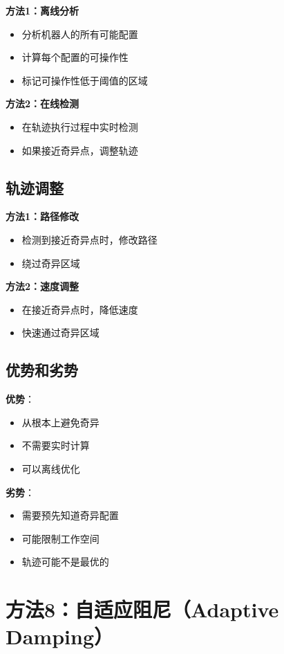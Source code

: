 \documentclass[12pt,a4paper]{article}
\begin{document}
\textbf{方法1：离线分析}
\begin{itemize}
\item 分析机器人的所有可能配置
\item 计算每个配置的可操作性
\item 标记可操作性低于阈值的区域
\end{itemize}

\textbf{方法2：在线检测}
\begin{itemize}
\item 在轨迹执行过程中实时检测
\item 如果接近奇异点，调整轨迹
\end{itemize}

\subsection{轨迹调整}

\textbf{方法1：路径修改}
\begin{itemize}
\item 检测到接近奇异点时，修改路径
\item 绕过奇异区域
\end{itemize}

\textbf{方法2：速度调整}
\begin{itemize}
\item 在接近奇异点时，降低速度
\item 快速通过奇异区域
\end{itemize}

\subsection{优势和劣势}

\textbf{优势}：
\begin{itemize}
\item 从根本上避免奇异
\item 不需要实时计算
\item 可以离线优化
\end{itemize}

\textbf{劣势}：
\begin{itemize}
\item 需要预先知道奇异配置
\item 可能限制工作空间
\item 轨迹可能不是最优的
\end{itemize}

\section{方法8：自适应阻尼（Adaptive Damping）}
\end{document}
